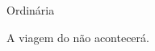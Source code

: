 \documentclass[11pt,twoside]{ata}
\begin{document}
\begin{reuniao}{Ordinária}
\begin{informes}
\item
A viagem do  não acontecerá.
\end{informes}

\begin{assuntos}
\item 
\aprovada

\item
\lipsum[2]
    
\item
\lipsum[4]

\item
\lipsum[4-5]
\end{assuntos}
\end{reuniao}

\end{document}
